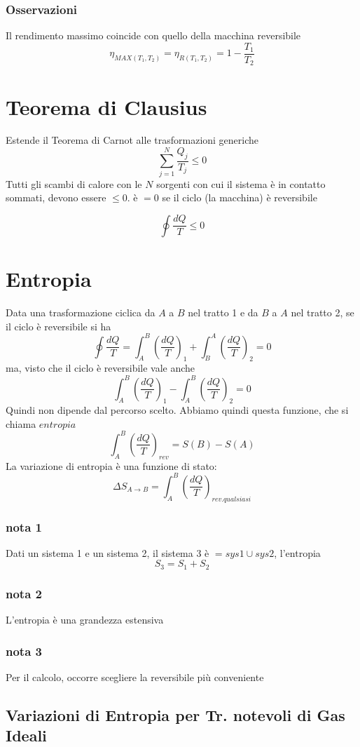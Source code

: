 \documentclass[a4paper]{report}
\begin{document}
  \subsubsection{Osservazioni}
  Il rendimento massimo coincide con quello della macchina reversibile
  \[ \eta_{MAX(T_1,T_2)} = \eta_{R(T_1,T_2)} = 1-\frac{T_1}{T_2} \]

  \section{Teorema di Clausius}
  Estende il Teorema di Carnot alle trasformazioni generiche
  \[ \sum_{j=1}^N \frac{Q_j}{T_j} \leq 0 \]
  Tutti gli scambi di calore con le $N$ sorgenti con cui il sistema è in contatto sommati, devono essere $\leq 0$. è $=0$ se il ciclo (la macchina) è reversibile

  \[ \oint \frac{dQ}{T} \leq 0 \]




  \section{Entropia}
  Data una trasformazione ciclica da $A$ a $B$ nel tratto 1 e da $B$ a $A$ nel tratto 2, se il ciclo è reversibile si ha
  \[ \oint \frac{dQ}{T} = \int_A^B (\frac{dQ}{T})_1 + \int_B^A (\frac{dQ}{T})_2 = 0\]
  ma, visto che il ciclo è reversibile vale anche
  \[ \int_A^B (\frac{dQ}{T})_1 - \int_A^B (\frac{dQ}{T})_2 = 0\]
  Quindi non dipende dal percorso scelto. Abbiamo quindi questa funzione, che si chiama $entropia$
  \[ \int_A^B (\frac{dQ}{T})_{rev} = S(B) -S(A) \]
  La variazione di entropia è una funzione di stato:
  \[ \Delta S_{A \rightarrow B} = \int_A^B (\frac{dQ}{T})_{rev. qualsiasi} \]
  \subsubsection{nota 1}
  Dati un sistema 1 e un sistema 2, il sistema 3 è $= sys1 \cup sys2$, l'entropia
  \[ S_3 = S_1 + S_2 \]
  \subsubsection{nota 2}
  L'entropia è una grandezza estensiva
  \subsubsection{nota 3}
  Per il calcolo, occorre scegliere la reversibile più conveniente
  \subsection{Variazioni di Entropia per Tr. notevoli di Gas Ideali}
\end{document}
